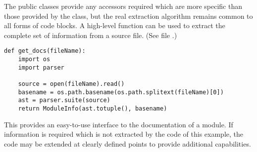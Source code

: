The public classes provide any accessors required which are more
specific than those provided by the  class, but
the real extraction algorithm remains common to all forms of code
blocks.  A high-level function can be used to extract the complete set
of information from a source file.  (See file .)

\begin{verbatim}
def get_docs(fileName):
    import os
    import parser

    source = open(fileName).read()
    basename = os.path.basename(os.path.splitext(fileName)[0])
    ast = parser.suite(source)
    return ModuleInfo(ast.totuple(), basename)
\end{verbatim}

This provides an easy-to-use interface to the documentation of a
module.  If information is required which is not extracted by the code
of this example, the code may be extended at clearly defined points to
provide additional capabilities.
